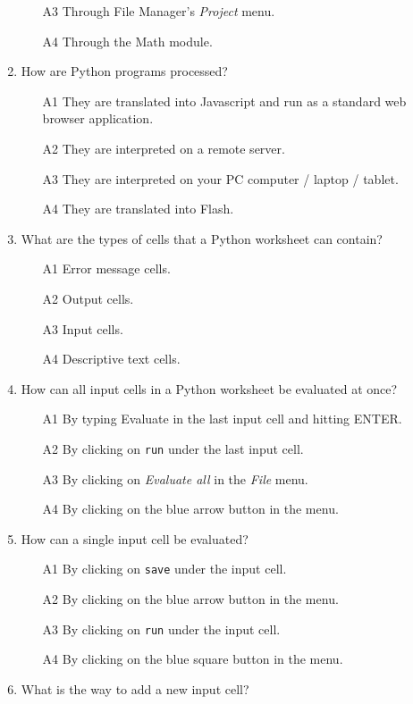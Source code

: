 \documentclass[article,A4,12pt]{llncs}
\begin{document}
\begin{enumerate}
\begin{enumerate}
\item[A3] Through File Manager's {\em Project} menu.
\item[A4] Through the Math module.
\end{enumerate}
\item How are Python programs processed?
\begin{enumerate}
\item[A1] They are translated into Javascript and run as a standard web browser application.
\item[A2] They are interpreted on a remote server.
\item[A3] They are interpreted on your PC computer / laptop / tablet.
\item[A4] They are translated into Flash.
\end{enumerate}
\item What are the types of cells that a Python worksheet can contain?
\begin{enumerate}
\item[A1] Error message cells.
\item[A2] Output cells.
\item[A3] Input cells.
\item[A4] Descriptive text cells.
\end{enumerate}
\item How can all input cells in a Python worksheet be evaluated at once?
\begin{enumerate}
\item[A1] By typing Evaluate in the last input cell and hitting ENTER.
\item[A2] By clicking on {\tt run} under the last input cell.
\item[A3] By clicking on {\em Evaluate all} in the {\em File} menu. 
\item[A4] By clicking on the blue arrow button in the menu.
\end{enumerate}
\item How can a single input cell be evaluated?
\begin{enumerate}
\item[A1] By clicking on {\tt save} under the input cell.
\item[A2] By clicking on the blue arrow button in the menu.
\item[A3] By clicking on {\tt run} under the input cell.
\item[A4] By clicking on the blue square button in the menu.
\end{enumerate}
\item What is the way to add a new input cell?

\end{enumerate}
\end{document}
